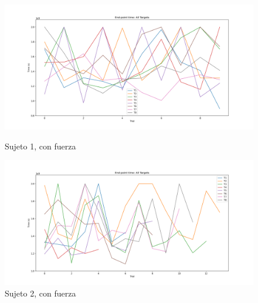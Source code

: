 \documentclass[a4paper,11pt, oneside]{book}
\begin{document}
\begin{figure}[h]
	\begin{minipage}[b]{0.5\linewidth}
		\centering
		\includegraphics[width=\linewidth]{sujeto1/force/evolution_time}
		\caption{Sujeto 1, con fuerza}
		\label{fig:figura1}
	\end{minipage}
	\hspace{0.5cm}
	\begin{minipage}[b]{0.5\linewidth}
		\centering
		\includegraphics[width=\linewidth]{sujeto2/force/evolution_time}
		\caption{Sujeto 2, con fuerza}
		\label{fig:figura2}
	\end{minipage}
\end{figure}
\end{document}
